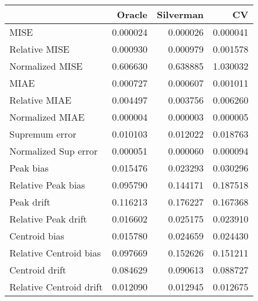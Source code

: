 \begin{tabular}{lrrr}
  \toprule
 & Oracle & Silverman & CV \\ 
  \midrule
MISE & 0.000024 & 0.000026 & 0.000041 \\ 
  Relative MISE & 0.000930 & 0.000979 & 0.001578 \\ 
  Normalized MISE & 0.606630 & 0.638885 & 1.030032 \\ 
  MIAE & 0.000727 & 0.000607 & 0.001011 \\ 
  Relative MIAE & 0.004497 & 0.003756 & 0.006260 \\ 
  Normalized MIAE & 0.000004 & 0.000003 & 0.000005 \\ 
  Supremum error & 0.010103 & 0.012022 & 0.018763 \\ 
  Normalized Sup error & 0.000051 & 0.000060 & 0.000094 \\ 
  Peak bias & 0.015476 & 0.023293 & 0.030296 \\ 
  Relative Peak bias & 0.095790 & 0.144171 & 0.187518 \\ 
  Peak drift & 0.116213 & 0.176227 & 0.167368 \\ 
  Relative Peak drift & 0.016602 & 0.025175 & 0.023910 \\ 
  Centroid bias & 0.015780 & 0.024659 & 0.024430 \\ 
  Relative Centroid bias & 0.097669 & 0.152626 & 0.151211 \\ 
  Centroid drift & 0.084629 & 0.090613 & 0.088727 \\ 
  Relative Centroid drift & 0.012090 & 0.012945 & 0.012675 \\ 
   \bottomrule
\end{tabular}
